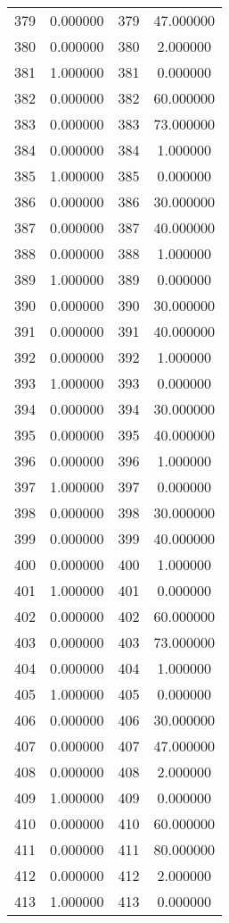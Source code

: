 \documentclass[12pt]{article}
\begin{document}
\begin{longtable}{@{}cccc@{}}
379 & 0.000000 & 379 & 47.000000 \\
380 & 0.000000 & 380 & 2.000000 \\
381 & 1.000000 & 381 & 0.000000 \\
382 & 0.000000 & 382 & 60.000000 \\
383 & 0.000000 & 383 & 73.000000 \\
384 & 0.000000 & 384 & 1.000000 \\
385 & 1.000000 & 385 & 0.000000 \\
386 & 0.000000 & 386 & 30.000000 \\
387 & 0.000000 & 387 & 40.000000 \\
388 & 0.000000 & 388 & 1.000000 \\
389 & 1.000000 & 389 & 0.000000 \\
390 & 0.000000 & 390 & 30.000000 \\
391 & 0.000000 & 391 & 40.000000 \\
392 & 0.000000 & 392 & 1.000000 \\
393 & 1.000000 & 393 & 0.000000 \\
394 & 0.000000 & 394 & 30.000000 \\
395 & 0.000000 & 395 & 40.000000 \\
396 & 0.000000 & 396 & 1.000000 \\
397 & 1.000000 & 397 & 0.000000 \\
398 & 0.000000 & 398 & 30.000000 \\
399 & 0.000000 & 399 & 40.000000 \\
400 & 0.000000 & 400 & 1.000000 \\
401 & 1.000000 & 401 & 0.000000 \\
402 & 0.000000 & 402 & 60.000000 \\
403 & 0.000000 & 403 & 73.000000 \\
404 & 0.000000 & 404 & 1.000000 \\
405 & 1.000000 & 405 & 0.000000 \\
406 & 0.000000 & 406 & 30.000000 \\
407 & 0.000000 & 407 & 47.000000 \\
408 & 0.000000 & 408 & 2.000000 \\
409 & 1.000000 & 409 & 0.000000 \\
410 & 0.000000 & 410 & 60.000000 \\
411 & 0.000000 & 411 & 80.000000 \\
412 & 0.000000 & 412 & 2.000000 \\
413 & 1.000000 & 413 & 0.000000 \\

\end{longtable}
\end{document}
